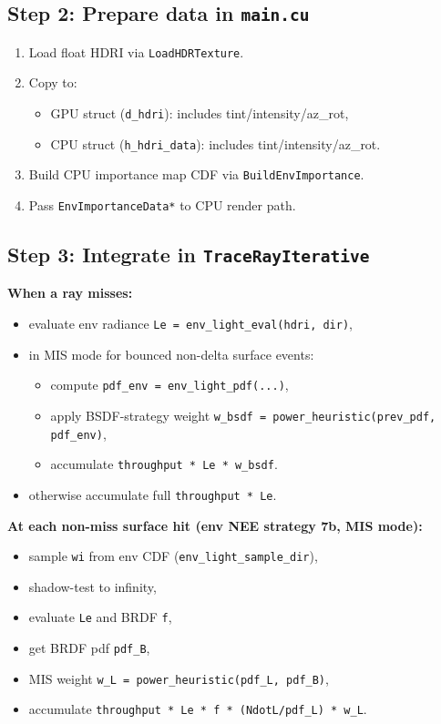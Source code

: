 \documentclass[11pt]{article}
\begin{document}
\subsection{Step 2: Prepare data in \texttt{main.cu}}
\begin{enumerate}[leftmargin=1.5em]
  \item Load float HDRI via \verb|LoadHDRTexture|.
  \item Copy to:
  \begin{itemize}
    \item GPU struct (\verb|d_hdri|): includes tint/intensity/az\_rot,
    \item CPU struct (\verb|h_hdri_data|): includes tint/intensity/az\_rot.
  \end{itemize}
  \item Build CPU importance map CDF via \verb|BuildEnvImportance|.
  \item Pass \verb|EnvImportanceData*| to CPU render path.
\end{enumerate}

\subsection{Step 3: Integrate in \texttt{TraceRayIterative}}
\textbf{When a ray misses:}
\begin{itemize}[leftmargin=1.5em]
  \item evaluate env radiance \verb|Le = env_light_eval(hdri, dir)|,
  \item in MIS mode for bounced non-delta surface events:
  \begin{itemize}
    \item compute \verb|pdf_env = env_light_pdf(...)|,
    \item apply BSDF-strategy weight \verb|w_bsdf = power_heuristic(prev_pdf, pdf_env)|,
    \item accumulate \verb|throughput * Le * w_bsdf|.
  \end{itemize}
  \item otherwise accumulate full \verb|throughput * Le|.
\end{itemize}

\textbf{At each non-miss surface hit (env NEE strategy 7b, MIS mode):}
\begin{itemize}[leftmargin=1.5em]
  \item sample \verb|wi| from env CDF (\verb|env_light_sample_dir|),
  \item shadow-test to infinity,
  \item evaluate \verb|Le| and BRDF \verb|f|,
  \item get BRDF pdf \verb|pdf_B|,
  \item MIS weight \verb|w_L = power_heuristic(pdf_L, pdf_B)|,
  \item accumulate \verb|throughput * Le * f * (NdotL/pdf_L) * w_L|.
\end{itemize}
\end{document}
